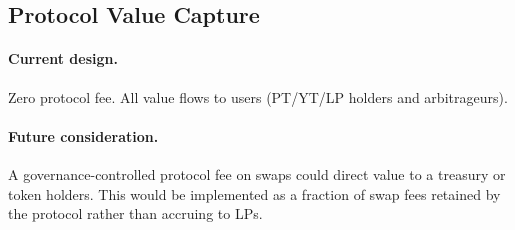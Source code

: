 \subsection{Protocol Value Capture}

\paragraph{Current design.} Zero protocol fee. All value flows to users (PT/YT/LP holders and arbitrageurs).

\paragraph{Future consideration.} A governance-controlled protocol fee on swaps could direct value to a treasury or token holders. This would be implemented as a fraction of swap fees retained by the protocol rather than accruing to LPs.

